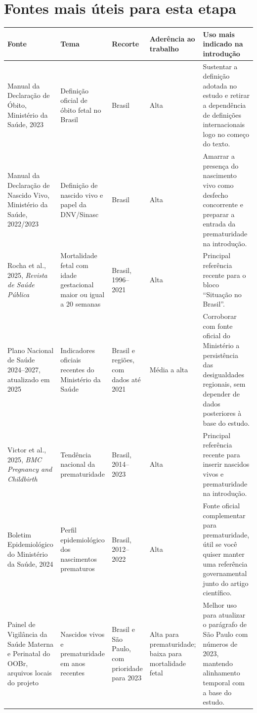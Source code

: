 \documentclass[12pt,a4paper]{article}
\begin{document}
\section*{Fontes mais úteis para esta etapa}

\small
\begin{longtable}{L{0.20\textwidth} L{0.18\textwidth} L{0.18\textwidth} L{0.16\textwidth} L{0.22\textwidth}}
\toprule
\textbf{Fonte} & \textbf{Tema} & \textbf{Recorte} & \textbf{Aderência ao trabalho} & \textbf{Uso mais indicado na introdução} \\
\midrule
\endhead
Manual da Declaração de Óbito, Ministério da Saúde, 2023 & Definição oficial de óbito fetal no Brasil & Brasil & Alta & Sustentar a definição adotada no estudo e retirar a dependência de definições internacionais logo no começo do texto. \\

Manual da Declaração de Nascido Vivo, Ministério da Saúde, 2022/2023 & Definição de nascido vivo e papel da DNV/Sinasc & Brasil & Alta & Amarrar a presença do nascimento vivo como desfecho concorrente e preparar a entrada da prematuridade na introdução. \\

Rocha et al., 2025, \textit{Revista de Saúde Pública} & Mortalidade fetal com idade gestacional maior ou igual a 20 semanas & Brasil, 1996--2021 & Alta & Principal referência recente para o bloco ``Situação no Brasil''. \\

Plano Nacional de Saúde 2024--2027, atualizado em 2025 & Indicadores oficiais recentes do Ministério da Saúde & Brasil e regiões, com dados até 2021 & Média a alta & Corroborar com fonte oficial do Ministério a persistência das desigualdades regionais, sem depender de dados posteriores à base do estudo. \\

Victor et al., 2025, \textit{BMC Pregnancy and Childbirth} & Tendência nacional da prematuridade & Brasil, 2014--2023 & Alta & Principal referência recente para inserir nascidos vivos e prematuridade na introdução. \\

Boletim Epidemiológico do Ministério da Saúde, 2024 & Perfil epidemiológico dos nascimentos prematuros & Brasil, 2012--2022 & Alta & Fonte oficial complementar para prematuridade, útil se você quiser manter uma referência governamental junto do artigo científico. \\

Painel de Vigilância da Saúde Materna e Perinatal do OOBr, arquivos locais do projeto & Nascidos vivos e prematuridade em anos recentes & Brasil e São Paulo, com prioridade para 2023 & Alta para prematuridade; baixa para mortalidade fetal & Melhor uso para atualizar o parágrafo de São Paulo com números de 2023, mantendo alinhamento temporal com a base do estudo. \\
\bottomrule
\end{longtable}
\normalsize
\end{document}
